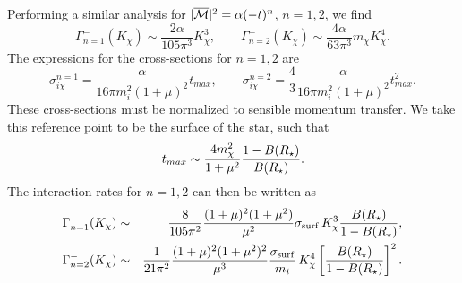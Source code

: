 Performing a similar analysis for $|\overline{\mathcal M}|^2=\alpha (-t)^n$, $n=1,2$, 
we find 
\begin{equation}
\Gamma_{n=1}^{-}(K_\chi) 
\sim \frac{2\alpha }{105\pi^3}K_\chi^3,\qquad 
\Gamma_{n=2}^{-}(K_\chi) 
\sim \frac{4\alpha }{63\pi^3}m_\chi K_\chi^4. 
\end{equation}
The expressions for the cross-sections for $n=1,2$ are 
\begin{equation}
\sigma^{n=1}_{i\chi} = \frac{\alpha}{16\pi m_i^2(1+\mu)^2}t_{max},\qquad
\sigma^{n=2}_{i\chi} = \frac{4}{3}\frac{\alpha}{16\pi m_i^2(1+\mu)^2}t_{max}^2.   
\end{equation}
These cross-sections must be normalized to sensible momentum transfer. We take this reference point to be the surface of the star, such that 
\begin{equation}
      t_{max} \sim \frac{4m_\chi^2}{1+\mu^2}\frac{1-B(R_\star)}{B(R_\star)}.   
\end{equation}
The interaction rates for $n=1,2$ can then be written as
\begin{eqnarray}
    \Gamma_{n=1}^{-}(K_\chi) &\sim& \frac{8}{105 \pi^2} \frac{(1+\mu)^2(1+\mu^2)}{\mu^2} \sigma_{\rm surf} \, K_\chi^3 \frac{B(R_\star)}{1-B(R_\star)}, \label{ch6:eq:intraten1}\\
\Gamma_{n=2}^{-}(K_\chi) &\sim& \frac{1}{21 \pi^2} \frac{(1+\mu)^2(1+\mu^2)^2}{\mu^3} \frac{\sigma_{\rm surf}}{m_i} \, K_\chi^4\left[\frac{B(R_\star)}{1-B(R_\star)}\right]^2.
\label{ch6:eq:intraten2}
\end{eqnarray}



